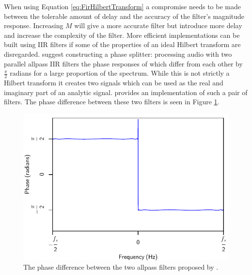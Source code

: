 			When using Equation \ref{eq:FirHilbertTransform} a compromise needs to be made between the
			tolerable amount of delay and the accuracy of the filter's magnitude response. Increasing $M$ will
			give a more accurate filter but introduce more delay and increase the complexity of the filter.
			More efficient implementations can be built using IIR filters if some of the properties of an ideal
			Hilbert transform are disregarded.  \citet{oppenheim2014discrete} suggest constructing a phase
			splitter: processing audio with two parallel allpass IIR filters the phase responses of which
			differ from each other by $\frac{\pi}{2}$ radians for a large proportion of the spectrum. While
			this is not strictly a Hilbert transform it creates two signals which can be used as the real and
			imaginary part of an analytic signal. \citet{niemitalo2003hilbert} provides an implementation of
			such a pair of filters. The phase difference between these two filters is seen in Figure
			\ref{fig:IIRHilbertPhase}.

			\begin{figure}[h!]
				\centering
				\includegraphics{chapter2/Images/IIRHilbertPhaseResponses.pdf}
				\caption{The phase difference between the two allpass filters proposed by
					 \citet{niemitalo2003hilbert}.}
				\label{fig:IIRHilbertPhase}
			\end{figure}

